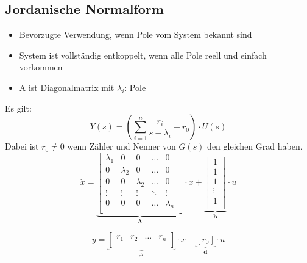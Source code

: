 \subsection{Jordanische Normalform}
\begin{itemize}
      \item Bevorzugte Verwendung, wenn Pole vom System bekannt sind
      \item System ist vollständig entkoppelt, wenn alle Pole reell und einfach vorkommen
      \item A ist Diagonalmatrix mit $\lambda_i$: Pole
\end{itemize}
Es gilt:
\[
	Y(s) = \left( \sum_{i=1}^{n} \frac{r_i}{s-\lambda_i} + r_0 \right) \cdot U(s)
\]
Dabei ist $r_0 \neq 0$ wenn Zähler und Nenner von $G(s)$ den gleichen Grad haben.
\[
	\dot x=
	\underbrace{
		\begin{bmatrix}
			\lambda_1 &	0 & 0 & \ldots & 0\\
			0 & \lambda_2 & 0 & \ldots & 0\\
			0 & 0 & \lambda_2 & \ldots & 0\\
			\vdots & \vdots & \vdots & \ddots & \vdots \\
			0 & 0 & 0 & \ldots & \lambda_n\\	
		\end{bmatrix}
	}_{\textbf{A}}
	\cdot x +
	\underbrace{
		\begin{bmatrix}
			1 \\
			1 \\
			1 \\
			\vdots \\
			1\\	
		\end{bmatrix}
	}_{\textbf{b}}
	\cdot u	
\]

\[
	y=
	\underbrace{
			\begin{bmatrix}
				r_1 & r_2 & \ldots & r_n\\
			\end{bmatrix}
	}_{\textbf{$c^T$}}
	\cdot x  +
	\underbrace{
		\left[ r_0 \right] 
	}_{\textbf{d}}
	\cdot u
\]

